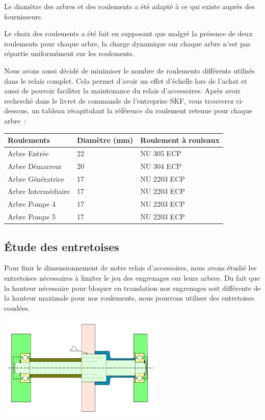 \documentclass{config}
\begin{document}
\begin{spacing}{1.2}
Le diamètre des arbres et des roulements a été adapté à ce qui existe auprès des fournisseurs. 

Le choix des roulements a été fait en supposant que malgré la présence de deux roulements pour chaque arbre, la charge dynamique sur chaque arbre n'est pas répartie uniformément sur les roulements. 

Nous avons aussi décidé de minimiser le nombre de roulements différents utilisés dans le relais complet. Cela permet d'avoir un effet d'échelle lors de l'achat et aussi de pouvoir faciliter la maintenance du relais d'accessoires.
Après avoir recherché dans le livret de commande de l'entreprise SKF, vous trouverez ci-dessous, un tableau récapitulant la référence du roulement retenue pour chaque arbre :

\begin{table}[h!]
\centering
{%
\begin{tabular}{|l|l|l|}
\hline
Roulements & Diamètre (mm) & Roulement à rouleaux \\ \hline
Arbre Entrée & 22 & NU 305 ECP \\ \hline
Arbre Démarreur & 20 & NU 304 ECP \\ \hline
Arbre Génératrice & 17 & NU 2203 ECP \\ \hline
Arbre Intermédiaire & 17 & NU 2203 ECP \\ \hline
Arbre Pompe 4 & 17 & NU 2203 ECP \\ \hline
Arbre Pompe 5 & 17 & NU 2203 ECP \\ \hline
\end{tabular}%
}
\end{table}



\newpage
\subsection{Étude des entretoises}

Pour finir le dimensionnement de notre relais d'accessoires, nous avons étudié les entretoises nécessaires à limiter le jeu des engrenages sur leurs arbres. Du fait que la hauteur nécessaire pour bloquer en translation nos engrenages soit différente de la hauteur maximale pour nos roulements, nous pourrons utiliser des entretoises coudées.

\begin{center}
\includegraphics[width=0.6\textwidth]{Solution_cannelures.png}
\end{center}





\end{spacing}
\end{document}
